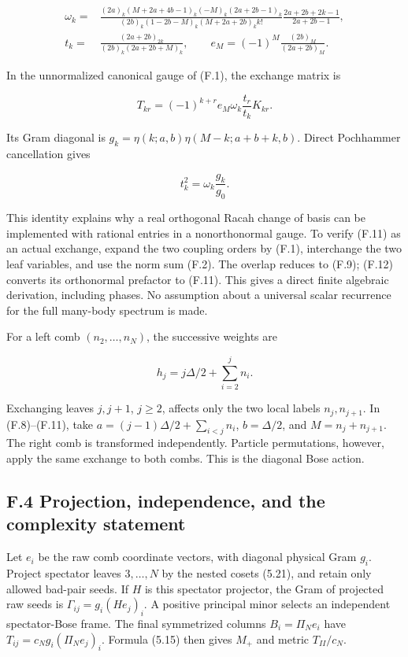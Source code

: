 \documentclass[a4paper,11pt]{article}
\numberwithin{equation}{section}
\begin{document}
\[
\begin{aligned}
\omega_k={}&\frac{(2a)_k(M+2a+4b-1)_k(-M)_k(2a+2b-1)_k}
{(2b)_k(1-2b-M)_k(M+2a+2b)_k k!}
\frac{2a+2b+2k-1}{2a+2b-1},\\
t_k={}&\frac{(2a+2b)_{2k}}{(2b)_k(2a+2b+M)_k},\qquad
e_M=(-1)^M\frac{(2b)_M}{(2a+2b)_M}.
\end{aligned}
\tag{F.10}
\]

In the unnormalized canonical gauge of (F.1), the exchange matrix is

\[
T_{kr}=(-1)^{k+r}e_M\omega_k\frac{t_r}{t_k}K_{kr}.
\tag{F.11}
\]

Its Gram diagonal is \(g_k=\eta(k;a,b)\eta(M-k;a+b+k,b)\). Direct Pochhammer cancellation gives

\[
t_k^2=\omega_k\frac{g_k}{g_0}.
\tag{F.12}
\]

This identity explains why a real orthogonal Racah change of basis can be implemented with rational entries in a nonorthonormal gauge. To verify (F.11) as an actual exchange, expand the two coupling orders by (F.1), interchange the two leaf variables, and use the norm sum (F.2). The overlap reduces to (F.9); (F.12) converts its orthonormal prefactor to (F.11). This gives a direct finite algebraic derivation, including phases. No assumption about a universal scalar recurrence for the full many-body spectrum is made.

For a left comb \((n_2,\ldots,n_N)\), the successive weights are

\[
h_j=j\Delta/2+\sum_{i=2}^j n_i.
\tag{F.13}
\]

Exchanging leaves \(j,j+1\), \(j\ge2\), affects only the two local labels \(n_j,n_{j+1}\). In (F.8)--(F.11), take \(a=(j-1)\Delta/2+\sum_{i<j}n_i\), \(b=\Delta/2\), and \(M=n_j+n_{j+1}\). The right comb is transformed independently. Particle permutations, however, apply the same exchange to both combs. This is the diagonal Bose action.

\hypertarget{f.4-projection-independence-and-the-complexity-statement}{%
\subsection{F.4 Projection, independence, and the complexity statement}\label{f.4-projection-independence-and-the-complexity-statement}}

Let \(e_i\) be the raw comb coordinate vectors, with diagonal physical Gram \(g_i\). Project spectator leaves \(3,\ldots,N\) by the nested cosets (5.21), and retain only allowed bad-pair seeds. If \(H\) is this spectator projector, the Gram of projected raw seeds is \(\Gamma_{ij}=g_i(He_j)_i\). A positive principal minor selects an independent spectator-Bose frame. The final symmetrized columns \(B_i=\Pi_Ne_i\) have \(T_{ij}=c_Ng_i(\Pi_Ne_j)_i\). Formula (5.15) then gives \(M_+\) and metric \(T_{II}/c_N\).
\end{document}
